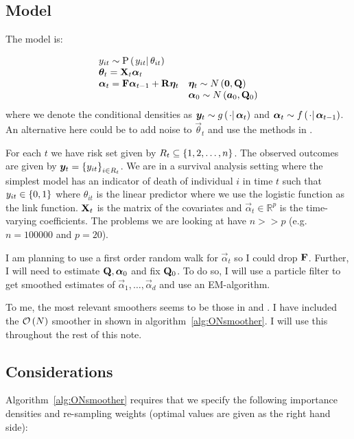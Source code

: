 \subsection*{Model}
The model is:

\begin{equation}
\begin{array}{ll}
 	y_{it} \sim \propC{y_{it}}{\theta_{it}} & \\
%
 	\vec{\theta}_{t} = \mat{X}_t\vec{\alpha}_t \\
% 
 	\vec{\alpha}_t = \mat{F}\vec{\alpha}_{t - 1} + \mat{R}\vec{\eta}_t &
 		\vec{\eta}_t \sim N\Lparen{\vec{0}, \mat{Q}} \\
%
	&	\vec{\alpha}_0 \sim N\Lparen{\vec{a}_0, \mat{Q}_0}
 \end{array}
\end{equation}%
%
where we denote the conditional densities as $\vec{y}_t \sim \optorC{g}{\cdot}{\vec{\alpha}_t}$ and $\vec{\alpha}_t \sim \optorC{f}{\cdot}{\vec{\alpha}_{t-1}}$. An alternative here could be to add noise to $\vec{\theta}_{t}$ and use the methods in \cite{andrieu02}.

For each $t$ we have risk set given by $R_t \subseteq \left\{ 1,2,\dots,n\right\}$. The observed outcomes are given by $\bm{y}_t = \left\{ y_{it}\right\}_{i \in R_t}$. We are in a survival analysis setting where the simplest model has an indicator of death of individual $i$ in time $t$ such that $y_{it} \in \left\{ 0, 1\right\}$ where $\theta_{it}$ is the linear predictor where we use the logistic function as the link function. $\mathbf{X}_t$ is the matrix of the covariates and $\vec{\alpha}_t \in \mathbb{R}^p$ is the time-varying coefficients. The problems we are looking at have $n >> p$ (e.g. $n = 100000$ and $p = 20$). 

 I am planning to use a first order random walk for $\vec{\alpha}_t$ so I could drop $\mathbf{F}$. Further, I will need to estimate $\mathbf{Q}, \bm{\alpha}_0$ and fix $\mathbf{Q}_0$. To do so, I will use a particle filter to get smoothed estimates of $\vec{\alpha}_1, \dots, \vec{\alpha}_d$ and use an EM-algorithm.

To me, the most relevant smoothers seems to be those in \cite{fearnhead10} and \cite{briers10}. I have included the $\mathcal{O}\left( N\right)$ smoother in \cite{fearnhead10} shown in algorithm~\ref{alg:ONsmoother}. I will use this throughout the rest of this note.



\subsection*{Considerations}
Algorithm~\ref{alg:ONsmoother} requires that we specify the following importance densities and re-sampling weights (optimal values are given as the right hand side):

